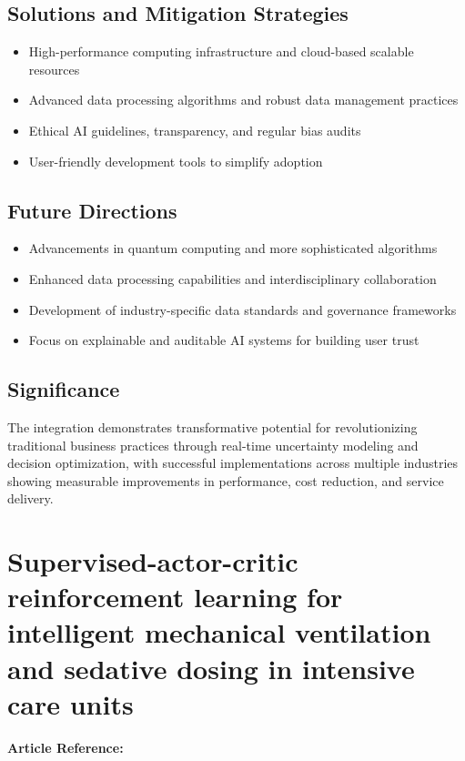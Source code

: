 \subsection*{Solutions and Mitigation Strategies}
\begin{itemize}
    \item High-performance computing infrastructure and cloud-based scalable resources
    \item Advanced data processing algorithms and robust data management practices
    \item Ethical AI guidelines, transparency, and regular bias audits
    \item User-friendly development tools to simplify adoption
\end{itemize}

\subsection*{Future Directions}
\begin{itemize}
    \item Advancements in quantum computing and more sophisticated algorithms
    \item Enhanced data processing capabilities and interdisciplinary collaboration
    \item Development of industry-specific data standards and governance frameworks
    \item Focus on explainable and auditable AI systems for building user trust
\end{itemize}

\subsection*{Significance}
The integration demonstrates transformative potential for revolutionizing traditional business practices through real-time uncertainty modeling and decision optimization, with successful implementations across multiple industries showing measurable improvements in performance, cost reduction, and service delivery.


\section{Supervised-actor-critic reinforcement learning for intelligent mechanical ventilation and sedative dosing in intensive care units}
\textbf{Article Reference:} \cite{yuSupervisedactorcriticReinforcementLearning2020}

